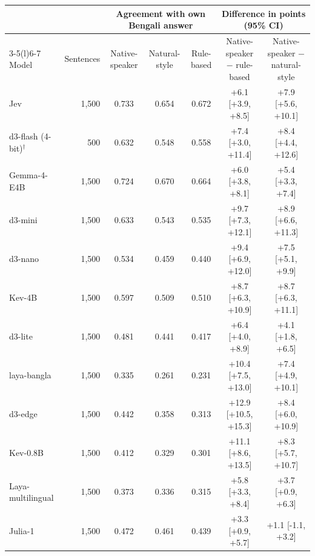 \begin{tabular}{@{}lrccccc@{}}\toprule
 & & \multicolumn{3}{c}{Agreement with own Bengali answer} & \multicolumn{2}{c}{Difference in points (95\% CI)} \\\cmidrule(lr){3-5}\cmidrule(l){6-7}
Model & Sentences & Native-speaker & Natural-style & Rule-based & Native-speaker $-$ rule-based & Native-speaker $-$ natural-style \\\midrule
Jev & 1,500 & 0.733 & 0.654 & 0.672 & +6.1 [+3.9, +8.5] & +7.9 [+5.6, +10.1] \\
d3-flash (4-bit)$^\dagger$ & 500 & 0.632 & 0.548 & 0.558 & +7.4 [+3.0, +11.4] & +8.4 [+4.4, +12.6] \\
Gemma-4-E4B & 1,500 & 0.724 & 0.670 & 0.664 & +6.0 [+3.8, +8.1] & +5.4 [+3.3, +7.4] \\
d3-mini & 1,500 & 0.633 & 0.543 & 0.535 & +9.7 [+7.3, +12.1] & +8.9 [+6.6, +11.3] \\
d3-nano & 1,500 & 0.534 & 0.459 & 0.440 & +9.4 [+6.9, +12.0] & +7.5 [+5.1, +9.9] \\
Kev-4B & 1,500 & 0.597 & 0.509 & 0.510 & +8.7 [+6.3, +10.9] & +8.7 [+6.3, +11.1] \\
d3-lite & 1,500 & 0.481 & 0.441 & 0.417 & +6.4 [+4.0, +8.9] & +4.1 [+1.8, +6.5] \\
laya-bangla & 1,500 & 0.335 & 0.261 & 0.231 & +10.4 [+7.5, +13.0] & +7.4 [+4.9, +10.1] \\
d3-edge & 1,500 & 0.442 & 0.358 & 0.313 & +12.9 [+10.5, +15.3] & +8.4 [+6.0, +10.9] \\
Kev-0.8B & 1,500 & 0.412 & 0.329 & 0.301 & +11.1 [+8.6, +13.5] & +8.3 [+5.7, +10.7] \\
Laya-multilingual & 1,500 & 0.373 & 0.336 & 0.315 & +5.8 [+3.3, +8.4] & +3.7 [+0.9, +6.3] \\
Julia-1 & 1,500 & 0.472 & 0.461 & 0.439 & +3.3 [+0.9, +5.7] & +1.1 [-1.1, +3.2] \\
\bottomrule\end{tabular}
